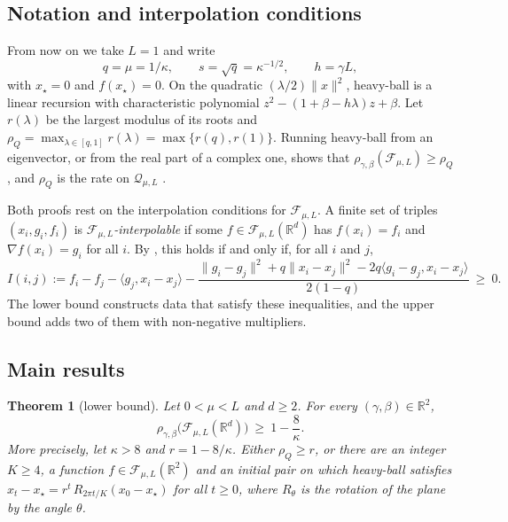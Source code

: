 \documentclass[11pt, a4paper]{article}
\newtheorem{theorem}{Theorem}
\theoremstyle{definition}
\newcommand{\R}{\mathbb{R}}
\newcommand{\F}{\mathcal{F}_{\mu,L}}
\newcommand{\Qc}{\mathcal{Q}_{\mu,L}}
\begin{document}
\subsection{Notation and interpolation conditions}

From now on we take $L=1$ and write
\[
  q=\mu=1/\kappa,\qquad s=\sqrt q=\kappa^{-1/2},\qquad h=\gamma L,
\]
with $x_\star=0$ and $f(x_\star)=0$. On the quadratic $(\lambda/2)\|x\|^2$, heavy-ball is a linear recursion with
characteristic polynomial $z^2-(1+\beta-h\lambda)z+\beta$. Let $r(\lambda)$ be the largest modulus of its roots and
$\rho_Q=\max_{\lambda\in[q,1]}r(\lambda)=\max\{r(q),r(1)\}$. Running heavy-ball from an eigenvector, or from the real part
of a complex one, shows that $\rho_{\gamma,\beta}(\F)\ge\rho_Q$, and $\rho_Q$ is the rate on $\Qc$
\citep[Prop.~2.1]{goujaud2025provable}.

Both proofs rest on the interpolation conditions for $\F$. A finite set of triples $(x_i,g_i,f_i)$ is
\emph{$\F$-interpolable} if some $f\in\F(\R^d)$ has $f(x_i)=f_i$ and $\nabla f(x_i)=g_i$ for all $i$. By
\citet[Thm.~4]{taylor2017smooth}, this holds if and only if, for all $i$ and $j$,
\begin{equation}
  I(i,j):=f_i-f_j-\langle g_j,x_i-x_j\rangle
  -\frac{\|g_i-g_j\|^2+q\|x_i-x_j\|^2-2q\langle g_i-g_j,x_i-x_j\rangle}{2(1-q)}\ \ge\ 0.
  \label{eq:thg}
\end{equation}
The lower bound constructs data that satisfy these inequalities, and the upper bound adds two of them with non-negative
multipliers.

\subsection{Main results}

\begin{theorem}[lower bound]
  \label{thm:lower}
  Let $0<\mu<L$ and $d\ge2$. For every $(\gamma,\beta)\in\R^2$,
  \[
    \rho_{\gamma,\beta}\bigl(\F(\R^d)\bigr)\ \ge\ 1-\frac{8}{\kappa}.
  \]
  More precisely, let $\kappa>8$ and $r=1-8/\kappa$. Either $\rho_Q\ge r$, or there are an integer $K\ge4$, a function
  $f\in\F(\R^2)$ and an initial pair on which heavy-ball satisfies $x_t-x_\star=r^t\,R_{2\pi t/K}(x_0-x_\star)$ for all
  $t\ge0$, where $R_\theta$ is the rotation of the plane by the angle $\theta$.
\end{theorem}
\end{document}
